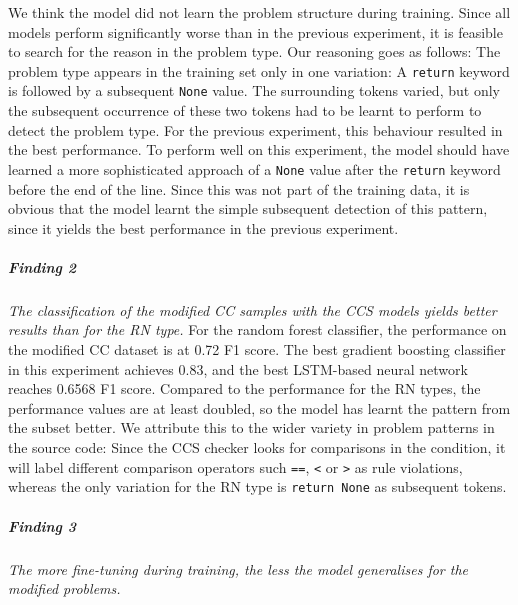 We think the model did not learn the problem structure during training. Since all models perform significantly worse than in the previous experiment, it is feasible to search for the reason in the problem type. Our reasoning goes as follows:
The problem type appears in the training set only in one variation: A \texttt{return} keyword is followed by a subsequent \texttt{None} value. The surrounding tokens varied, but only the subsequent occurrence of these two tokens had to be learnt to perform to detect the problem type. For the previous experiment, this behaviour resulted in the best performance. To perform well on this experiment, the model should have learned a more sophisticated approach of a \texttt{None} value after the \texttt{return} keyword before the end of the line. Since this was not part of the training data, it is obvious that the model learnt the simple subsequent detection of this pattern, since it yields the best performance in the previous experiment.

\subparagraph{Finding 2}\label{finding:ccs_more_variety}
\textit{The classification of the modified CC samples with the CCS models yields better results than for the RN type.}
For the random forest classifier, the performance on the modified CC dataset is at 0.72 F1 score. The best gradient boosting classifier in this experiment achieves 0.83, and the best LSTM-based neural network reaches 0.6568 F1 score. 
Compared to the performance for the RN types, the performance values are at least doubled, so the model has learnt the pattern from the subset better. We attribute this to the wider variety in problem patterns in the source code: Since the CCS checker looks for comparisons in the condition, it will label different comparison operators such \texttt{==}, \texttt{<} or \texttt{>} as rule violations, whereas the only variation for the RN type is \texttt{return None} as subsequent tokens.

\subparagraph{Finding 3}\label{finding:better_vs_worse}
\textit{The more fine-tuning during training, the less the model generalises for the modified problems.}

